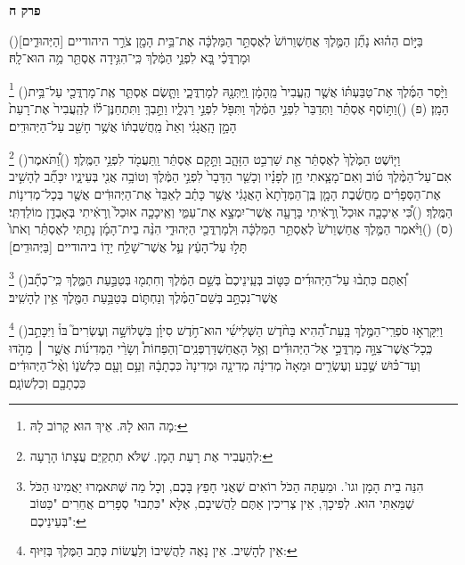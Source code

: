 \documentclass[12pt, openany]{book}
\newcommand{\sethebfont}{
\fontsize{10.5pt}{13.1pt} \selectfont
}
\newcommand{\twocol}[1]{
	{\sethebfont \begin{multicols}{2}
			#1
	\end{multicols}}	
}
\newcommand{\chapname}{}
\newcommand{\newchap}[1]{
	\addcontentsline{toc}{chapter}{#1}
	\renewcommand{\chapname}{#1}
		\begin{center}
			\textbf{%
\fontsize{16pt}{16pt}\selectfont
				#1}
		\end{center}
}
\newcommand{\footnotecomment}[1]{
	\renewcommand\thefootnote{}
	\footnote{#1}}
\newcommand{\commenta}[1]{\footnotecomment{#1}\hspace{0em}}
\newcommand{\vsnum}[1]{(\hebrewnumeral{#1})\space}
\begin{document}
\newchap{פרק ח}
\twocol{\vsnum{1}בַּיּ֣וֹם הַה֗וּא נָתַ֞ן הַמֶּ֤לֶךְ אֲחַשְׁוֵרוֹשׁ֙ לְאֶסְתֵּ֣ר הַמַּלְכָּ֔ה אֶת־בֵּ֥ית הָמָ֖ן צֹרֵ֣ר היהודיים [הַיְּהוּדִ֑ים] וּמָרְדֳּכַ֗י בָּ֚א לִפְנֵ֣י הַמֶּ֔לֶךְ כִּֽי־הִגִּ֥ידָה אֶסְתֵּ֖ר מַ֥ה הוּא־לָֽהּ׃%
\commenta{מָה הוּא לָהּ. אֵיךְ הוּא קָרוֹב לָהּ:}%
\vsnum{2}וַיָּ֨סַר הַמֶּ֜לֶךְ אֶת־טַבַּעְתּ֗וֹ אֲשֶׁ֤ר הֶֽעֱבִיר֙ מֵֽהָמָ֔ן וַֽיִּתְּנָ֖הּ לְמָרְדֳּכָ֑י וַתָּ֧שֶׂם אֶסְתֵּ֛ר אֶֽת־מָרְדֳּכַ֖י עַל־בֵּ֥ית הָמָֽן׃ (פ)
\vsnum{3}וַתּ֣וֹסֶף אֶסְתֵּ֗ר וַתְּדַבֵּר֙ לִפְנֵ֣י הַמֶּ֔לֶךְ וַתִּפֹּ֖ל לִפְנֵ֣י רַגְלָ֑יו וַתֵּ֣בְךְּ וַתִּתְחַנֶּן־ל֗וֹ לְהַֽעֲבִיר֙ אֶת־רָעַת֙ הָמָ֣ן הָֽאֲגָגִ֔י וְאֵת֙ מַֽחֲשַׁבְתּ֔וֹ אֲשֶׁ֥ר חָשַׁ֖ב עַל־הַיְּהוּדִֽים׃%
\commenta{לְהַעֲבִיר אֶת רָעַת הָמָן. שֶׁלֹּא תִתְקַיֵּם עֲצָתוֹ הָרָעָה:}%
\vsnum{4}וַיּ֤וֹשֶׁט הַמֶּ֙לֶךְ֙ לְאֶסְתֵּ֔ר אֵ֖ת שַׁרְבִ֣ט הַזָּהָ֑ב וַתָּ֣קָם אֶסְתֵּ֔ר וַֽתַּעֲמֹ֖ד לִפְנֵ֥י הַמֶּֽלֶךְ׃
\vsnum{5}וַ֠תֹּאמֶר אִם־עַל־הַמֶּ֨לֶךְ ט֜וֹב וְאִם־מָצָ֧אתִי חֵ֣ן לְפָנָ֗יו וְכָשֵׁ֤ר הַדָּבָר֙ לִפְנֵ֣י הַמֶּ֔לֶךְ וְטוֹבָ֥ה אֲנִ֖י בְּעֵינָ֑יו יִכָּתֵ֞ב לְהָשִׁ֣יב אֶת־הַסְּפָרִ֗ים מַחֲשֶׁ֜בֶת הָמָ֤ן בֶּֽן־הַמְּדָ֙תָא֙ הָאֲגָגִ֔י אֲשֶׁ֣ר כָּתַ֗ב לְאַבֵּד֙ אֶת־הַיְּהוּדִ֔ים אֲשֶׁ֖ר בְּכָל־מְדִינ֥וֹת הַמֶּֽלֶךְ׃
\vsnum{6}כִּ֠י אֵיכָכָ֤ה אוּכַל֙ וְֽרָאִ֔יתִי בָּרָעָ֖ה אֲשֶׁר־יִמְצָ֣א אֶת־עַמִּ֑י וְאֵֽיכָכָ֤ה אוּכַל֙ וְֽרָאִ֔יתִי בְּאָבְדַ֖ן מוֹלַדְתִּֽי׃ (ס)
\vsnum{7}וַיֹּ֨אמֶר הַמֶּ֤לֶךְ אֲחַשְׁוֵרֹשׁ֙ לְאֶסְתֵּ֣ר הַמַּלְכָּ֔ה וּֽלְמָרְדֳּכַ֖י הַיְּהוּדִ֑י הִנֵּ֨ה בֵית־הָמָ֜ן נָתַ֣תִּי לְאֶסְתֵּ֗ר וְאֹתוֹ֙ תָּל֣וּ עַל־הָעֵ֔ץ עַ֛ל אֲשֶׁר־שָׁלַ֥ח יָד֖וֹ ביהודיים [בַּיְּהוּדִֽים׃]%
\commenta{הִנֵּה בֵית הָמָן וגו'. וּמֵעַתָּה הַכֹּל רוֹאִים שֶׁאֲנִי חָפֵץ בָּכֶם, וְכָל מַה שֶּׁתּאמְרוּ יַאֲמִינוּ הַכֹּל שֶׁמֵּאִתִּי הוּא. לְפִיכָךְ, אֵין צְרִיכִין אַתֶּם לַהֲשִׁיבָם, אֶלָּא "כִּתְבוּ" סְפָרִים אֲחֵרִים "כַּטּוֹב בְּעֵינֵיכֶם": }%
\vsnum{8}וְ֠אַתֶּם כִּתְב֨וּ עַל־הַיְּהוּדִ֜ים כַּטּ֤וֹב בְּעֵֽינֵיכֶם֙ בְּשֵׁ֣ם הַמֶּ֔לֶךְ וְחִתְמ֖וּ בְּטַבַּ֣עַת הַמֶּ֑לֶךְ כִּֽי־כְתָ֞ב אֲשֶׁר־נִכְתָּ֣ב בְּשֵׁם־הַמֶּ֗לֶךְ וְנַחְתּ֛וֹם בְּטַבַּ֥עַת הַמֶּ֖לֶךְ אֵ֥ין לְהָשִֽׁיב׃%
\commenta{אֵין לְהָשִׁיב. אֵין נָאֶה לַהֲשִׁיבוֹ וְלַעֲשׂוֹת כְּתַב הַמֶּלֶךְ בְּזִיּוּף:}%
\vsnum{9}וַיִּקָּרְא֣וּ סֹפְרֵֽי־הַמֶּ֣לֶךְ בָּֽעֵת־הַ֠הִיא בַּחֹ֨דֶשׁ הַשְּׁלִישִׁ֜י הוּא־חֹ֣דֶשׁ סִיוָ֗ן בִּשְׁלוֹשָׁ֣ה וְעֶשְׂרִים֮ בּוֹ֒ וַיִּכָּתֵ֣ב כְּֽכָל־אֲשֶׁר־צִוָּ֣ה מָרְדֳּכַ֣י אֶל־הַיְּהוּדִ֡ים וְאֶ֣ל הָאֲחַשְׁדַּרְפְּנִֽים־וְהַפַּחוֹת֩ וְשָׂרֵ֨י הַמְּדִינ֜וֹת אֲשֶׁ֣ר ׀ מֵהֹ֣דּוּ וְעַד־כּ֗וּשׁ שֶׁ֣בַע וְעֶשְׂרִ֤ים וּמֵאָה֙ מְדִינָ֔ה מְדִינָ֤ה וּמְדִינָה֙ כִּכְתָבָ֔הּ וְעַ֥ם וָעָ֖ם כִּלְשֹׁנ֑וֹ וְאֶ֨ל־הַיְּהוּדִ֔ים כִּכְתָבָ֖ם וְכִלְשׁוֹנָֽם׃%
}
\end{document}
